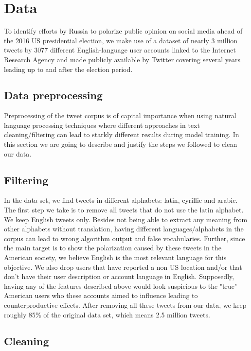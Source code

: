\documentclass[12pt, authoryear]{elsarticle}
\begin{document}
\section{Data}
To identify efforts by Russia to polarize public opinion on social media ahead of the 2016 US presidential election, we make use of a dataset of nearly 3 million tweets by 3077 different English-language user accounts linked to the Internet Research Agency and made publicly available by Twitter covering several years leading up to and after the election period.

\subsection{Data preprocessing}
    
Preprocessing of the tweet corpus is of capital importance when using natural language processing techniques where different approaches in text cleaning/filtering can lead to starkly different results during model training. In this section we are going to describe and justify the steps we followed to clean our data.
    
\subsection{Filtering}

In the data set, we find tweets in different alphabets: latin, cyrillic and arabic. The first step we take is to remove all tweets that do not use the latin alphabet. We keep English tweets only. Besides not being able to extract any meaning from other alphabets without translation, having different languages/alphabets in the corpus can lead to wrong algorithm output and false vocabularies. Further, since the main target is to show the polarization caused by these tweets in the American society, we believe English is the most relevant language for this objective. We also drop users that have reported a non US location and/or that don't have their user description or account language in English. Supposedly, having any of the features described above would look suspicious to the "true" American users who these accounts aimed to influence leading to counterproductive effects. After removing all these tweets from our data, we keep roughly 85\% of the original data set, which means 2.5 million tweets.

\subsection{Cleaning}
\end{document}
